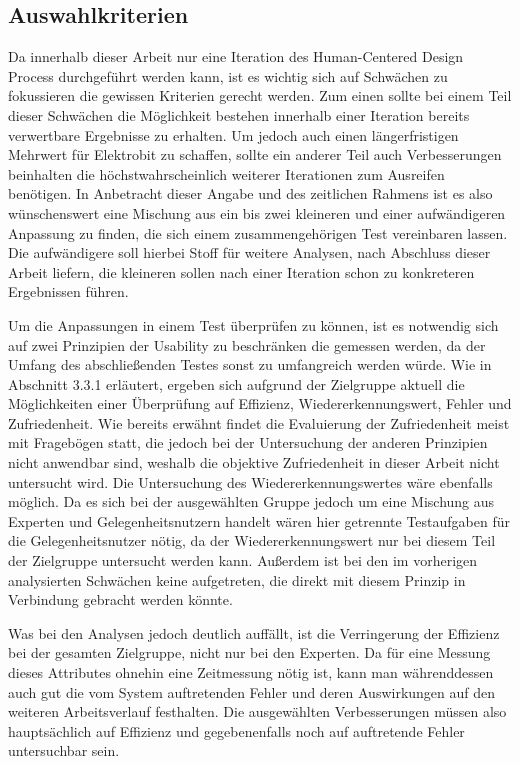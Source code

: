 \subsection{Auswahlkriterien}
Da innerhalb dieser Arbeit nur eine Iteration des Human-Centered Design Process durchgeführt werden kann, ist es wichtig sich auf Schwächen zu fokussieren die gewissen Kriterien gerecht werden.
Zum einen sollte bei einem Teil dieser Schwächen die Möglichkeit bestehen innerhalb einer Iteration bereits verwertbare Ergebnisse zu erhalten.
Um jedoch auch einen längerfristigen Mehrwert für Elektrobit zu schaffen, sollte ein anderer Teil auch Verbesserungen beinhalten die höchstwahrscheinlich weiterer Iterationen zum Ausreifen benötigen.
In Anbetracht dieser Angabe und des zeitlichen Rahmens ist es also wünschenswert eine Mischung aus ein bis zwei kleineren und einer aufwändigeren Anpassung zu finden, die sich einem zusammengehörigen Test vereinbaren lassen.
Die aufwändigere soll hierbei Stoff für weitere Analysen, nach Abschluss dieser Arbeit liefern, die kleineren sollen nach einer Iteration schon zu konkreteren Ergebnissen führen.

Um die Anpassungen in einem Test überprüfen zu können, ist es notwendig sich auf zwei Prinzipien der Usability zu beschränken die gemessen werden, da der Umfang des abschließenden Testes sonst zu umfangreich werden würde. Wie in Abschnitt 3.3.1 erläutert, ergeben sich aufgrund der Zielgruppe aktuell die Möglichkeiten einer Überprüfung auf Effizienz, Wiedererkennungswert, Fehler und Zufriedenheit.
Wie bereits erwähnt findet die Evaluierung der Zufriedenheit meist mit Fragebögen statt, die jedoch bei der Untersuchung der anderen Prinzipien nicht anwendbar sind, weshalb die objektive Zufriedenheit in dieser Arbeit nicht untersucht wird.
Die Untersuchung des Wiedererkennungswertes wäre ebenfalls möglich.
Da es sich bei der ausgewählten Gruppe jedoch um eine Mischung aus Experten und Gelegenheitsnutzern handelt wären hier getrennte Testaufgaben für die Gelegenheitsnutzer nötig, da der Wiedererkennungswert nur bei diesem Teil der Zielgruppe untersucht werden kann.
Außerdem ist bei den im vorherigen analysierten Schwächen keine aufgetreten, die direkt mit diesem Prinzip in Verbindung gebracht werden könnte.

Was bei den Analysen jedoch deutlich auffällt, ist die Verringerung der Effizienz bei der gesamten Zielgruppe, nicht nur bei den Experten.
Da für eine Messung dieses Attributes ohnehin eine Zeitmessung nötig ist, kann man währenddessen auch gut die vom System auftretenden Fehler und deren Auswirkungen auf den weiteren Arbeitsverlauf festhalten.
Die ausgewählten Verbesserungen müssen also hauptsächlich auf Effizienz und gegebenenfalls noch auf auftretende Fehler untersuchbar sein.

